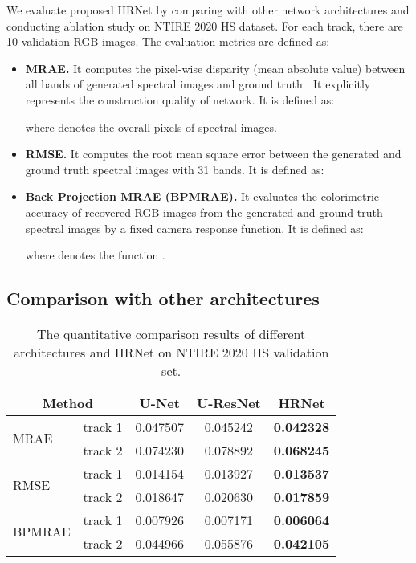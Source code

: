 \documentclass[10pt,twocolumn,letterpaper]{article}
\begin{document}
We evaluate proposed HRNet by comparing with other network architectures and conducting ablation study on NTIRE 2020 HS dataset. For each track, there are 10 validation RGB images. The evaluation metrics are defined as:

\begin{itemize}

\item \textbf{MRAE.} It computes the pixel-wise disparity (mean absolute value) between all bands of generated spectral images  and ground truth . It explicitly represents the construction quality of network. It is defined as:


where  denotes the overall pixels of spectral images.

\item \textbf{RMSE.} It computes the root mean
square error between the generated and ground truth spectral images with 31 bands. It is defined as:



\item \textbf{Back Projection MRAE (BPMRAE).} It evaluates the colorimetric accuracy of recovered RGB images from the generated and ground truth spectral images by a fixed camera response function. It is defined as:


where  denotes the function .

\end{itemize}

\subsection{Comparison with other architectures}



\begin{table}[t]
\begin{center}
\begin{tabular}{lcccc}
\hline
\multicolumn{2}{c}{Method} & U-Net & U-ResNet & HRNet \\
\hline
\hline
\multirow{2}{*}{MRAE} & track 1 & 0.047507 & 0.045242 & \textbf{0.042328} \\
 & track 2 & 0.074230 & 0.078892 & \textbf{0.068245} \\
\hline
\multirow{2}{*}{RMSE} & track 1 & 0.014154 & 0.013927 & \textbf{0.013537} \\
 & track 2 & 0.018647 & 0.020630 & \textbf{0.017859} \\
\hline
\multirow{2}{*}{BPMRAE} & track 1 & 0.007926 & 0.007171 & \textbf{0.006064} \\
 & track 2 & 0.044966 & 0.055876 & \textbf{0.042105} \\
\hline
\end{tabular}
\end{center}
\caption{The quantitative comparison results of different architectures and HRNet on NTIRE 2020 HS validation set.}
\label{comparison}
\end{table}
\end{document}
